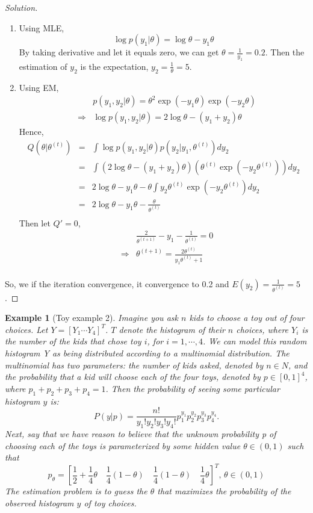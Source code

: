 \documentclass[11pt]{article}
\newtheorem{example}{Example}[section]
\begin{document}
\begin{proof}[Solution]\let\qed\relax
$ $
\begin{enumerate}
\item Using MLE,
$$
\log p(y_1|\theta) = \log\theta -y_1\theta
$$
By taking derivative and let it equals zero, we can get $\theta=\frac{1}{y_1}=0.2$. Then the estimation of $y_2$ is the expectation, $y_2 = \frac{1}{\theta}=5$.

\item Using EM, 
\begin{eqnarray*}
&& p(y_1, y_2 | \theta) = \theta^2\exp(-y_1\theta)\exp(-y_2\theta) \\
&\Rightarrow& \log p(y_1, y_2 | \theta) = 2\log \theta - (y_1+y_2)\theta 
\end{eqnarray*}
Hence, 
\begin{eqnarray*}
Q(\theta|\theta^{(t)})&=&\int \log p(y_1, y_2 | \theta) p(y_2 | y_1, \theta^{(t)}) dy_2\\\
&=& \int (2\log \theta - (y_1+y_2)\theta)( \theta^{(t)}\exp(-y_2 \theta^{(t)})) dy_2\\
&=& 2\log\theta - y_1\theta -\theta \int y_2\theta^{(t)}\exp(-y_2 \theta^{(t)}) dy_2 \\
&=& 2\log\theta - y_1\theta - \frac{\theta}{\theta^{(t)}}\\
\end{eqnarray*}
Then let $Q'=0$,
\begin{eqnarray*}
&&\frac{2}{\theta^{(t+1)}}-y_1-\frac{1}{\theta^{(t)}} = 0 \\
&\Rightarrow& \theta^{(t+1)} = \frac{2\theta^{(t)}}{y_1\theta^{(t)}+1} \\
\end{eqnarray*}
\end{enumerate}
So, we if the iteration convergence, it convergence to 0.2 and $E(y_2) = \frac{1}{\theta^{(t)}} = 5$.
\end{proof}
\begin{example}[Toy example 2]
Imagine you ask $n$ kids to choose a toy out of four choices. Let $Y = [Y_1 \cdots Y_4]^T$. $T$ denote the histogram of their $n$ choices, where $Y_i$ is the number of the kids that chose toy $i$, for $i = 1,\cdots,4$. We
can model this random histogram Y as being distributed according
to a multinomial distribution. The multinomial has two parameters:
the number of kids asked, denoted by $n \in N$, and the probability that
a kid will choose each of the four toys, denoted by $p \in [0,1]^4$, where
$p_1 + p_2 + p_3 + p_4 = 1$. Then the probability of seeing some particular
histogram $y$ is:
$$
P(y|p) = \frac{n!}{y_1!y_2!y_3!y_4!}p_1^{y_1}p_2^{y_2}p_3^{y_3}p_4^{y_4}.
$$
Next, say that we have reason to believe that the unknown probability
p of choosing each of the toys is parameterized by some hidden
value $\theta\in(0,1)$ such that
$$
p_\theta = \left[\frac{1}{2}+\frac{1}{4}\theta\quad \frac{1}{4}\left(1-\theta\right)\quad \frac{1}{4}\left(1-\theta\right) \quad \frac{1}{4}\theta \right]^T,\, \theta\in(0,1)
$$
The estimation problem is to guess the $\theta$ that maximizes the probability
of the observed histogram $y$ of toy choices.
\end{example}
\end{document}
